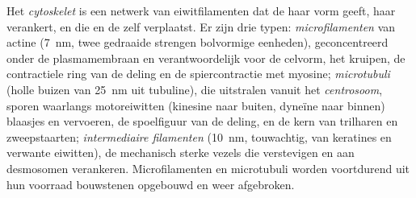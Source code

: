 \begin{definition}[Cytoskelet]\label{def:b1:eukaryotic-cell:cytoskeleton}
Het \emph{cytoskelet} is een netwerk van eiwitfilamenten dat de
 haar vorm geeft, haar  verankert, en die  en de  zelf
verplaatst. Er zijn drie typen:
\emph{microfilamenten} van actine (\qty{7}{nm}, twee
gedraaide strengen bolvormige eenheden), geconcentreerd onder de plasmamembraan
en verantwoordelijk voor de celvorm, het kruipen, de contractiele ring van de
deling en de spiercontractie met myosine;
\emph{microtubuli} (holle buizen van \qty{25}{nm} uit
tubuline), die uitstralen vanuit het \emph{centrosoom}, sporen
waarlangs motoreiwitten (kinesine naar buiten, dyneïne naar binnen) blaasjes en
 vervoeren, de spoelfiguur van de deling, en de kern van trilharen en
zweepstaarten; \emph{intermediaire filamenten}
(\qty{10}{nm}, touwachtig, van keratines en verwante eiwitten), de mechanisch
sterke vezels die  verstevigen en aan desmosomen verankeren.
Microfilamenten en microtubuli worden voortdurend uit hun voorraad bouwstenen
opgebouwd en weer afgebroken.
\end{definition}

